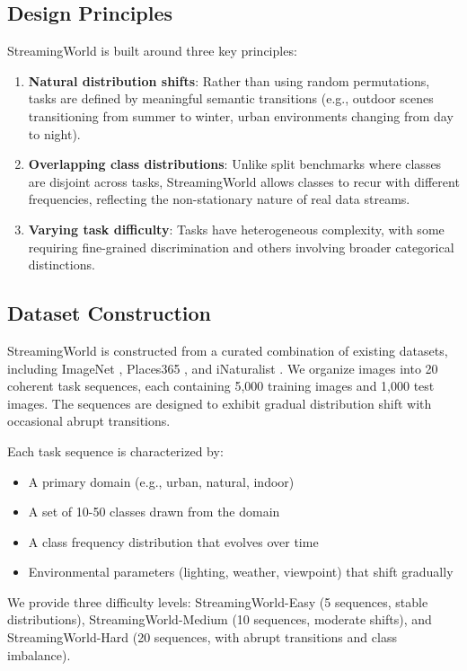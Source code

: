 \documentclass[11pt]{article}
\begin{document}
\subsection{Design Principles}

StreamingWorld is built around three key principles:
\begin{enumerate}
    \item \textbf{Natural distribution shifts}: Rather than using random permutations, tasks are defined by meaningful semantic transitions (e.g., outdoor scenes transitioning from summer to winter, urban environments changing from day to night).
    \item \textbf{Overlapping class distributions}: Unlike split benchmarks where classes are disjoint across tasks, StreamingWorld allows classes to recur with different frequencies, reflecting the non-stationary nature of real data streams.
    \item \textbf{Varying task difficulty}: Tasks have heterogeneous complexity, with some requiring fine-grained discrimination and others involving broader categorical distinctions.
\end{enumerate}

\subsection{Dataset Construction}

StreamingWorld is constructed from a curated combination of existing datasets, including ImageNet \citep{deng2009imagenet}, Places365 \citep{zhou2017places}, and iNaturalist \citep{van2018inaturalist}. We organize images into 20 coherent task sequences, each containing 5,000 training images and 1,000 test images. The sequences are designed to exhibit gradual distribution shift with occasional abrupt transitions.

Each task sequence is characterized by:
\begin{itemize}
    \item A primary domain (e.g., urban, natural, indoor)
    \item A set of 10-50 classes drawn from the domain
    \item A class frequency distribution that evolves over time
    \item Environmental parameters (lighting, weather, viewpoint) that shift gradually
\end{itemize}

We provide three difficulty levels: StreamingWorld-Easy (5 sequences, stable distributions), StreamingWorld-Medium (10 sequences, moderate shifts), and StreamingWorld-Hard (20 sequences, with abrupt transitions and class imbalance).
\end{document}
